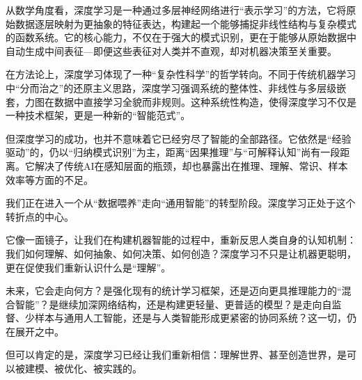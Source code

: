从数学角度看，深度学习是一种通过多层神经网络进行“表示学习”的方法，它将原始数据逐层映射为更抽象的特征表达，构建起一个能够捕捉非线性结构与复杂模式的函数系统。它的核心能力，不仅在于强大的模式识别，更在于能够从原始数据中自动生成中间表征---即便这些表征对人类并不直观，却对机器决策至关重要。

在方法论上，深度学习体现了一种“复杂性科学”的哲学转向。不同于传统机器学习中“分而治之”的还原主义思路，深度学习强调系统的整体性、非线性与多层级嵌套，力图在数据中直接学习全貌而非规则。这种系统性构造，使得深度学习不仅是一种技术框架，更是一种新的“智能范式”。

但深度学习的成功，也并不意味着它已经穷尽了智能的全部路径。它依然是“经验驱动”的，仍以“归纳模式识别”为主，距离“因果推理”与“可解释认知”尚有一段距离。它解决了传统AI在感知层面的瓶颈，却也暴露出在推理、理解、常识、样本效率等方面的不足。

我们正在进入一个从“数据喂养”走向“通用智能”的转型阶段。深度学习正处于这个转折点的中心。

它像一面镜子，让我们在构建机器智能的过程中，重新反思人类自身的认知机制：我们如何理解、如何抽象、如何决策、如何创造？深度学习不只是让机器更聪明，更在促使我们重新认识什么是“理解”。

未来，它会走向何方？是强化现有的统计学习框架，还是迈向更具推理能力的“混合智能”？是继续加深网络结构，还是构建更轻量、更普适的模型？是走向自监督、少样本与通用人工智能，还是与人类智能形成更紧密的协同系统？这一切，仍在展开之中。

但可以肯定的是，深度学习已经让我们重新相信：理解世界、甚至创造世界，是可以被建模、被优化、被实践的。

\nocite{*}
\printbibliography[heading=bibintoc, title=\ebibname]

\newpage
